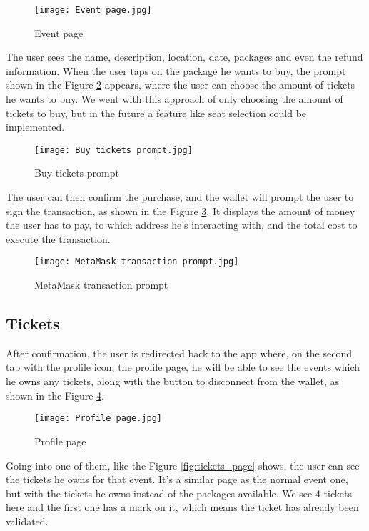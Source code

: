 \begin{figure}[H]
	\texttt{[image: Event page.jpg]}
	\centering
	\caption{Event page}
	\label{fig:event_page}
\end{figure}

The user sees the name, description, location, date, packages and even the
refund information. When the user taps on the package he wants to buy, the
prompt shown in the Figure \ref{fig:buy_tickets_prompt} appears, where the user
can choose the amount of tickets he wants to buy. We went with this approach of
only choosing the amount of tickets to buy, but in the future a feature like
seat selection could be implemented.

\begin{figure}[H]
	\texttt{[image: Buy tickets prompt.jpg]}
	\centering
	\caption{Buy tickets prompt}
	\label{fig:buy_tickets_prompt}
\end{figure}

The user can then confirm the purchase, and the wallet will prompt the user to
sign the transaction, as shown in the Figure
\ref{fig:metamask_transaction_prompt}. It displays the amount of money the user
has to pay, to which address he's interacting with, and the total cost to
execute the transaction.

\begin{figure}[H]
	\texttt{[image: MetaMask transaction prompt.jpg]}
	\centering
	\caption{MetaMask transaction prompt}
	\label{fig:metamask_transaction_prompt}
\end{figure}

\subsection{Tickets}
\label{subsec:tickets}

After confirmation, the user is redirected back to the app where, on the second
tab with the profile icon, the profile page, he will be able to see the events
which he owns any tickets, along with the button to disconnect from the wallet,
as shown in the Figure \ref{fig:profile_page}.

\begin{figure}[H]
	\texttt{[image: Profile page.jpg]}
	\centering
	\caption{Profile page}
	\label{fig:profile_page}
\end{figure}

Going into one of them, like the Figure \ref{fig:tickets_page} shows, the user
can see the tickets he owns for that event. It's a similar page as the normal
event one, but with the tickets he owns instead of the packages available. We
see 4 tickets here and the first one has a mark on it, which means the ticket
has already been validated.

